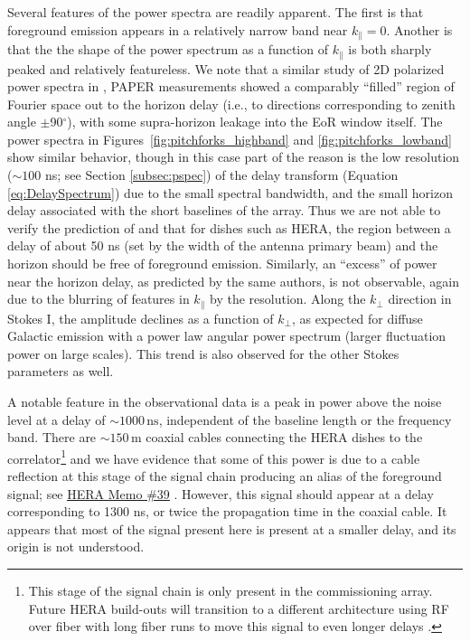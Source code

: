 \documentclass[twocolumn, trackchanges]{aastex61}
\begin{document}
Several features of the power spectra are readily apparent.  The first is that
foreground emission appears in a relatively narrow band near $k_\parallel = 0$.
Another is that the the shape of the power spectrum as a function of
$k_\parallel$ is both sharply peaked and relatively featureless.  We note that a
similar study of 2D polarized power spectra in \citet{Kohn16}, PAPER
measurements showed a comparably ``filled'' region of Fourier space out to the
horizon delay (i.e., to directions corresponding to zenith angle
$\pm$90$^{\circ}$), with some supra-horizon leakage \citep[e.g.,][]{Pober13}
into the EoR window itself. The power spectra in
Figures~\ref{fig:pitchforks_highband} and \ref{fig:pitchforks_lowband} show
similar behavior, though in this case part of the reason is the low resolution
($\sim100$ ns; see Section \ref{subsec:pspec}) of the delay transform (Equation
\ref{eq:DelaySpectrum}) due to the small spectral bandwidth, and the small
horizon delay associated with the short baselines of the array.  Thus we are not
able to verify the prediction of \citet{Nithya.15b} and \citet{Neben.16} that
for dishes such as HERA, the region between a delay of about 50 ns (set by the
width of the antenna primary beam) and the horizon should be free of foreground
emission.  Similarly, an ``excess'' of power near the horizon delay, as
predicted by the same authors, is not observable, again due to the blurring of
features in $k_\parallel$ by the resolution.  Along the $k_\perp$ direction in
Stokes I, the amplitude declines as a function of $k_\perp$, as expected for
diffuse Galactic emission with a power law angular power spectrum (larger
fluctuation power on large scales).  This trend is also observed for the other
Stokes parameters as well.

A notable feature in the observational data is a peak in power above the noise
level at a delay of $\sim1000 \, \mathrm{ns}$, independent of the baseline
length or the frequency band.  There are $\sim 150 \, \mathrm{m}$ coaxial cables
connecting the HERA dishes to the correlator\footnote{This stage of the signal
  chain is only present in the commissioning array. Future HERA build-outs will
  transition to a different architecture using RF over fiber with long fiber
  runs to move this signal to even longer delays \citep{deBoer17}.} and we have
evidence that some of this power is due to a cable reflection at this stage of
the signal chain producing an alias of the foreground signal; see
\href{http://reionization.org/wp-content/uploads/2013/03/HERA39_H1C_cable_reflections_ewall-wice.pdf}{\underline{HERA
    Memo \#39}} \citep{hera_memo39}.  However, this signal should appear at a
delay corresponding to 1300 ns, or twice the propagation time in the coaxial
cable.  It appears that most of the signal present here is present at a smaller
delay, and its origin is not understood.
\end{document}
